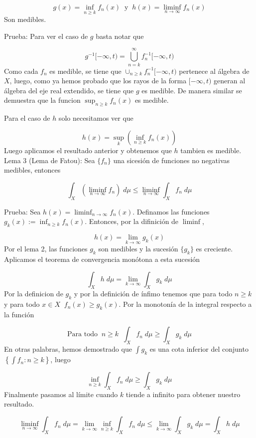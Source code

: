 \documentclass[12pt]{article}
\begin{document}
    \[g(x) = \inf_{n \geq k} f_n(x)\;\; \text{y}\;\; h(x) = \liminf_{n\rightarrow \infty} f_n(x)\]
    Son medibles.

    Prueba: Para ver el caso de $g$ basta notar que

    \[g^{-1}[-\infty,t) = \bigcup_{n=k}^{\infty} f_n^{-1}[-\infty,t)\]
    Como cada $f_n$ es medible, se tiene que $\cup_{n \geq k} f_n^{-1}[-\infty,t)$ pertenece al 
    \'algebra de $X$, luego, como ya hemos probado que los rayos de la forma 
    $[-\infty,t)$ generan al \'algebra del eje real extendido, se tiene que $g$ es medible.
    De manera similar se demuestra que la funcion $\sup_{n \geq k} f_n(x)$ es medible.
    
    Para el caso de $h$ solo necesitamos ver que 

    \[h(x) = \sup_k(\inf_{n \geq k}f_n(x))\]
    Luego aplicamos el resultado anterior y obtenemos que $h$ tambien es medible.
    \\

    Lema 3 (Lema de Fatou): Sea $\{f_n\}$ una sicesi\'on de funciones no negativas
    medibles, entonces  

    \[\int_X \left(\liminf_{n\rightarrow \infty}f_n \right)\;d\mu \leq \liminf_{n\rightarrow \infty} \int_X f_n\;d\mu\]
    
    Prueba: Sea  $h(x) = \liminf_{n\rightarrow \infty} f_n(x)$. Definamos 
    las funciones $g_k(x) := \inf_{n \geq k}f_n(x)$. Entonces, por la difinici\'on de 
    $\liminf$,

    \[h(x) = \lim_{k\rightarrow \infty}g_k(x)\]
    Por el lema 2, las funciones $g_k$ son medibles y la sucesi\'on $\{g_k\}$ es creciente. Aplicamos el 
    teorema de convergencia mon\'otona a esta sucesi\'on

    \[\int_X h\;d\mu = \lim_{k\rightarrow \infty} \int_X g_k\;d\mu\]
    Por la definicion de $g_k$ y por la definici\'on de \'infimo tenemos que para todo 
    $n \geq k$ y para todo $x\in X\;\; f_n(x) \geq g_k(x)$. Por la monoton\'ia de la 
    integral respecto a la funci\'on
    
    \[\text{Para todo}\;\; n\geq k\;\; \int_X f_n\;d\mu \geq \int_X g_k\;d\mu\]
    En otras palabras, hemos demostrado que $\int g_k$ es una cota inferior del conjunto
    $\left\{\int f_n : n \geq k\right\}$, luego 

    \[\inf_{n\geq k} \int_X f_n\;d\mu \geq \int_X g_k\;d\mu\]
    Finalmente pasamos al l\'imite cuando $k$ tiende a infinito para obtener nuestro 
    resultado.

    \[\liminf_{n\rightarrow \infty} \int_Xf_n \;d\mu = \lim_{k\rightarrow \infty}\inf_{n\geq k} \int_X f_n\;d\mu \leq \lim_{k\rightarrow \infty}\int_X g_k\;d\mu = \int_X h\;d\mu\]
    \\
\end{document}
